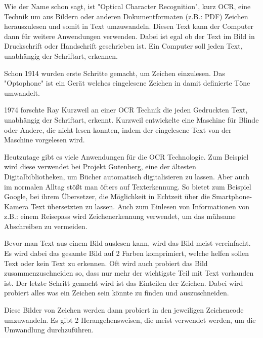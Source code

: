 

Wie der Name schon sagt, ist "Optical Character Recognition", kurz OCR, eine Technik um aus Bildern oder anderen Dokumentformaten (z.B.: PDF) Zeichen herauszulesen und somit in Text umzuwandeln. Diesen Text kann der Computer dann für weitere Anwendungen verwenden. Dabei ist egal ob der Text im Bild in Druckschrift oder Handschrift geschrieben ist. Ein Computer soll jeden Text, unabhängig der Schriftart, erkennen.


Schon 1914 wurden erste Schritte gemacht, um Zeichen einzulesen. Das "Optophone" ist ein Gerät welches eingelesene Zeichen in damit definierte Töne umwandelt.

1974 forschte Ray Kurzweil an einer OCR Technik die jeden Gedruckten Text, unabhängig der Schriftart, erkennt. Kurzweil entwickelte eine Maschine für Blinde oder Andere, die nicht lesen konnten, indem der eingelesene Text von der Maschine vorgelesen wird.

Heutzutage gibt es viele Anwendungen für die OCR Technologie. Zum Beispiel wird diese verwendet bei Projekt Gutenberg, eine der ältesten Digitalbibliotheken, um Bücher automatisch digitalisieren zu lassen. Aber auch im normalen Alltag stößt man öfters auf Texterkennung. So bietet zum Beispiel Google, bei ihrem Übersetzer, die Möglichkeit in Echtzeit über die Smartphone-Kamera Text übersetzten zu lassen. Auch zum Einlesen von Informationen von z.B.: einem Reisepass wird Zeichenerkennung verwendet, um das mühsame Abschreiben zu vermeiden.


Bevor man Text aus einem Bild auslesen kann, wird das Bild meist vereinfacht. Es wird dabei das gesamte Bild auf 2 Farben komprimiert, welche helfen sollen Text oder kein Text zu erkennen. Oft wird auch probiert das Bild zusammenzuschneiden so, dass nur mehr der wichtigste Teil mit Text vorhanden ist. Der letzte Schritt gemacht wird ist das Einteilen der Zeichen. Dabei wird probiert alles was ein Zeichen sein könnte zu finden und auszuschneiden.

Diese Bilder von Zeichen werden dann probiert in den jeweiligen Zeichencode
umzuwandeln. Es gibt 2 Herangehensweisen, die meist verwendet werden, um die Umwandlung durchzuführen.


